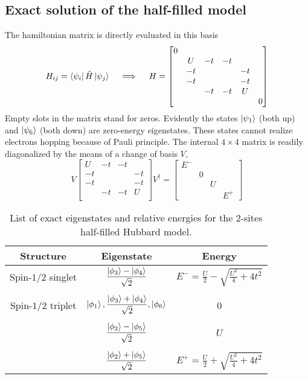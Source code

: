 \subsection{Exact solution of the half-filled model}

The hamiltonian matrix is directly evaluated in this basis
\[
	H_{ij} = \bra{\psi_i}{\hat H}\ket{\psi_j}
	\quad\implies\quad
	H = \begin{bmatrix}
		0 &    &    &    &    &    \\
		&  U & -t & -t &    &    \\
		& -t &    &    & -t &    \\
		& -t &    &    & -t &    \\
		&    & -t & -t &  U &    \\
		&    &    &    &    &  0 \\  
	\end{bmatrix}
\]
Empty slots in the matrix stand for zeros. Evidently the states $\ket{\psi_1}$ (both up) and $\ket{\psi_6}$ (both down) are zero-energy eigenstates. These states cannot realize electrons hopping because of Pauli principle. The internal $4 \times 4$ matrix is readily diagonalized by the means of a change of basis $V$,
\[
	V \begin{bmatrix}
		 U & -t & -t &     \\
		-t &    &    & -t  \\
		-t &    &    & -t  \\
		   & -t & -t &  U  \\
	\end{bmatrix} V^\dagger = \begin{bmatrix}
	E^- &   & 	& 	 \\
	    & 0 & 	&	 \\
		&   & U & 	 \\
		&	&	& E^+
	\end{bmatrix}
\]

\begin{table}
	\centering
	\begin{tabular}{c c c}
		Structure & Eigenstate & Energy \\
		\midrule
		Spin-$1/2$ singlet & $\displaystyle \frac{\ket{\phi_3} - \ket{\phi_4}}{\sqrt{2}}$ & $\displaystyle E^- = \frac{U}{2} - \sqrt{\frac{U^2}{4} + 4t^2}$ \\
		&&\\ %
		Spin-$1/2$ triplet & $\ket{\phi_1}, \displaystyle \frac{\ket{\phi_3} + \ket{\phi_4}}{\sqrt{2}}, \ket{\phi_6}$ & 0 \\
		&&\\ %
		&$\displaystyle \frac{\ket{\phi_2}-\ket{\phi_5}}{\sqrt{2}}$ & $U$\\
		&&\\ %
		&$\displaystyle \frac{\ket{\phi_2}+\ket{\phi_5}}{\sqrt{2}}$ & $\displaystyle E^+ = \frac{U}{2} + \sqrt{\frac{U^2}{4} + 4t^2}$ \\
	\end{tabular}
	\caption{List of exact eigenstates and relative energies for the $2$-sites half-filled Hubbard model.}
	\label{apptab:two-sites-hubbard-model-eigenstates}
\end{table}

